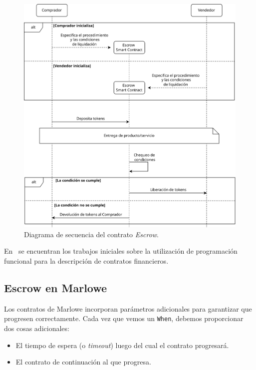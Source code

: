 \documentclass[12pt]{book}
\begin{document}
\begin{figure}[H]
    \centering
    \includegraphics[width=\textwidth]{Escrow.png}
    \caption{Diagrama de secuencia del contrato \textit{Escrow}.}\label{fig:Escrow}
\end{figure}

En~\cite{composing-contracts, multi-party-contracts} se encuentran los trabajos iniciales sobre la utilización de programación funcional para la descripción de contratos financieros.

\subsection{Escrow en Marlowe}

Los contratos de Marlowe incorporan parámetros adicionales para garantizar que progresen correctamente. Cada vez que vemos un \texttt{When}, debemos proporcionar dos cosas adicionales:

\begin{itemize}
    \item El tiempo de espera (o \textit{timeout}) luego del cual el contrato progresará.
    \item El contrato de continuación al que progresa.
\end{itemize}
\end{document}
